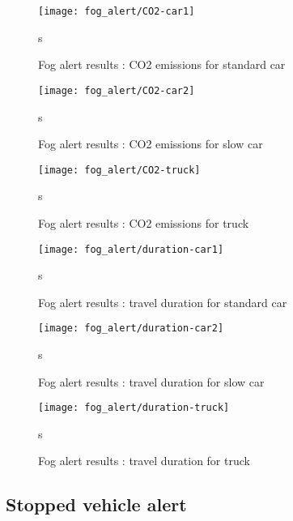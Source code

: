 \documentclass[a4paper,10pt]{article}
\begin{document}
\begin{figure}[h!]
    \begin{center}
         \texttt{[image: fog\_alert/CO2-car1]}
    \end{center}s
  \caption{ Fog alert results : CO2 emissions for standard car}
  \label{fig:ttc_part}
\end{figure}


\begin{figure}[h!]
    \begin{center}
         \texttt{[image: fog\_alert/CO2-car2]}
    \end{center}s
  \caption{ Fog alert results : CO2 emissions for slow car}
  \label{fig:ttc_part}
\end{figure}


\begin{figure}[h!]
    \begin{center}
         \texttt{[image: fog\_alert/CO2-truck]}
    \end{center}s
  \caption{ Fog alert results : CO2 emissions for truck}
  \label{fig:ttc_part}
\end{figure}

\begin{figure}[h!]
    \begin{center}
         \texttt{[image: fog\_alert/duration-car1]}
    \end{center}s
  \caption{ Fog alert results : travel duration for standard car}
  \label{fig:ttc_part}
\end{figure}


\begin{figure}[h!]
    \begin{center}
         \texttt{[image: fog\_alert/duration-car2]}
    \end{center}s
  \caption{ Fog alert results : travel duration for slow car}
  \label{fig:ttc_part}
\end{figure}


\begin{figure}[h!]
    \begin{center}
         \texttt{[image: fog\_alert/duration-truck]}
    \end{center}s
  \caption{ Fog alert results : travel duration for truck}
  \label{fig:ttc_part}
\end{figure}

\FloatBarrier

\subsection{Stopped vehicle alert}
\end{document}
